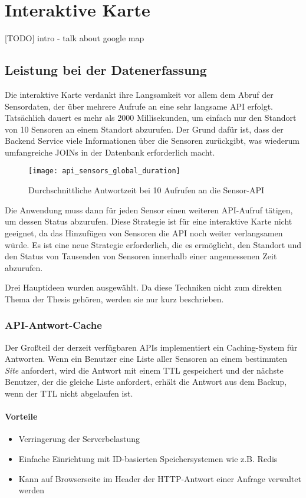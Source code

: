 \section{Interaktive Karte}
 [TODO] intro
- talk about google map

\subsection{Leistung bei der Datenerfassung}

Die interaktive Karte verdankt ihre Langsamkeit vor allem dem Abruf der Sensordaten, der über mehrere Aufrufe an eine sehr langsame API erfolgt.
Tatsächlich dauert es mehr als 2000 Millisekunden, um einfach nur den Standort von 10 Sensoren an einem Standort abzurufen.
Der Grund dafür ist, dass der Backend Service viele Informationen über die Sensoren zurückgibt, was wiederum umfangreiche JOINs in der Datenbank erforderlich macht.

\begin{figure}[H]
  \centering
  \texttt{[image: api\_sensors\_global\_duration]}
  \caption{Durchschnittliche Antwortzeit bei 10 Aufrufen an die Sensor-API}
  \label{fig:api_sensors_global_duration}
\end{figure}

Die Anwendung muss dann für jeden Sensor einen weiteren API-Aufruf tätigen, um dessen Status abzurufen.
Diese Strategie ist für eine interaktive Karte nicht geeignet, da das Hinzufügen von Sensoren die API noch weiter verlangsamen würde.
Es ist eine neue Strategie erforderlich, die es ermöglicht, den Standort und den Status von Tausenden von Sensoren innerhalb einer angemessenen Zeit abzurufen.

Drei Hauptideen wurden ausgewählt.
Da diese Techniken nicht zum direkten Thema der Thesis gehören, werden sie nur kurz beschrieben.

\subsubsection{API-Antwort-Cache}

Der Großteil der derzeit verfügbaren APIs implementiert ein Caching-System für Antworten\cite{redis}.
Wenn ein Benutzer eine Liste aller Sensoren an einem bestimmten \textit{Site} anfordert, wird die Antwort mit einem \ac{TTL} gespeichert und der nächste Benutzer, der die gleiche Liste anfordert, erhält die Antwort aus dem Backup, wenn der \ac{TTL} nicht abgelaufen ist.

\paragraph{Vorteile}
\begin{itemize}
  \item Verringerung der Serverbelastung
  \item Einfache Einrichtung mit ID-basierten Speichersystemen wie z.B. Redis
  \item Kann auf Browserseite im Header der \ac{HTTP}-Antwort einer Anfrage verwaltet werden
\end{itemize}

